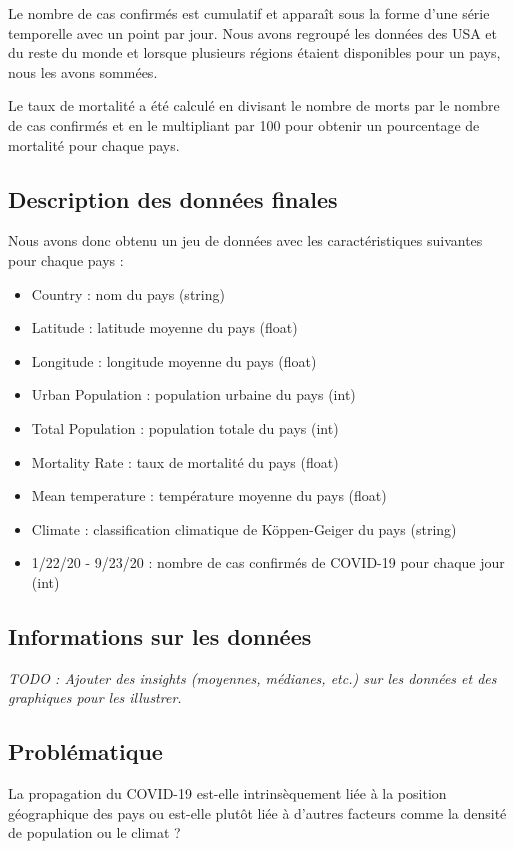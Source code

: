 \documentclass[12pt]{iEEEtran}
\begin{document}
Le nombre de cas confirmés est cumulatif et apparaît sous la forme d'une série temporelle
avec un point par jour. Nous avons regroupé les données des USA et du reste du monde et
lorsque plusieurs régions étaient disponibles pour un pays, nous les avons sommées.

Le taux de mortalité a été calculé en divisant le nombre de morts par le nombre de cas confirmés
et en le multipliant par 100 pour obtenir un pourcentage de mortalité pour chaque pays.

\subsection{Description des données finales}
Nous avons donc obtenu un jeu de données avec les caractéristiques suivantes pour chaque pays :
\begin{itemize}
    \item Country : nom du pays (string)
    \item Latitude : latitude moyenne du pays (float)
    \item Longitude : longitude moyenne du pays (float)
    \item Urban Population : population urbaine du pays (int)
    \item Total Population : population totale du pays (int)
    \item Mortality Rate : taux de mortalité du pays (float)
    \item Mean temperature : température moyenne du pays (float)
    \item Climate : classification climatique de Köppen-Geiger du pays (string)
    \item 1/22/20 - 9/23/20 : nombre de cas confirmés de COVID-19 pour chaque jour (int)
\end{itemize}

\subsection{Informations sur les données}
\textit{TODO : Ajouter des insights (moyennes, médianes, etc.) sur les données et
des graphiques pour les illustrer.}

\subsection{Problématique}
La propagation du COVID-19 est-elle intrinsèquement liée à la position géographique des pays
ou est-elle plutôt liée à d'autres facteurs comme la densité de population ou le climat ?
\end{document}
